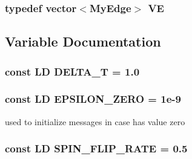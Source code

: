 \subsubsection{\setlength{\rightskip}{0pt plus 5cm}typedef vector$<${\bf MyEdge}$>$ {\bf VE}}\label{mygraph_8h_cf639edfac4fe33605e6eb66c5897380}




\subsection{Variable Documentation}
\subsubsection{\setlength{\rightskip}{0pt plus 5cm}const {\bf LD} {\bf DELTA\_\-T} = 1.0}\label{mygraph_8h_401bf47513f50ae6ff9312cff50bccd6}


\subsubsection{\setlength{\rightskip}{0pt plus 5cm}const {\bf LD} {\bf EPSILON\_\-ZERO} = 1e-9}\label{mygraph_8h_6dc7054ecf7c3bc13d5e4676d3cdf2f2}


used to initialize messages in case has value zero 

\subsubsection{\setlength{\rightskip}{0pt plus 5cm}const {\bf LD} {\bf SPIN\_\-FLIP\_\-RATE} = 0.5}\label{mygraph_8h_71b0a5b43bf9ff2933040fe3e3e0c65c}


